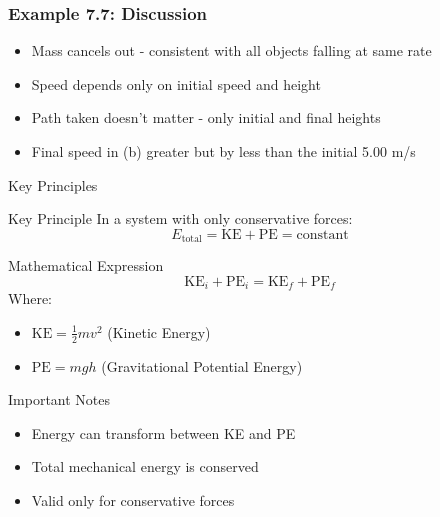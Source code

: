 \documentclass{beamer}
\begin{document}
\begin{frame}
\frametitle{Example 7.7: Discussion}
\begin{itemize}
    \item Mass cancels out - consistent with all objects falling at same rate
    \pause
    \item Speed depends only on initial speed and height
    \pause
    \item Path taken doesn't matter - only initial and final heights
    \pause
    \item Final speed in (b) greater but by less than the initial 5.00 m/s
\end{itemize}

\end{frame}

\begin{frame}{Key Principles}
\begin{block}{Key Principle}
In a system with only conservative forces:
\[E_{\text{total}} = \text{KE} + \text{PE} = \text{constant}\]
\end{block}
\pause

\begin{block}{Mathematical Expression}
\[\text{KE}_i + \text{PE}_i = \text{KE}_f + \text{PE}_f\]
Where:
\begin{itemize}
\item \(\text{KE} = \frac{1}{2}mv^2\) (Kinetic Energy)
\item \(\text{PE} = mgh\) (Gravitational Potential Energy)
\end{itemize}
\end{block}
\pause

\begin{alertblock}{Important Notes}
\begin{itemize}
\item Energy can transform between KE and PE
\pause
\item Total mechanical energy is conserved
\pause
\item Valid only for conservative forces
\end{itemize}
\end{alertblock}
\end{frame}
\end{document}

